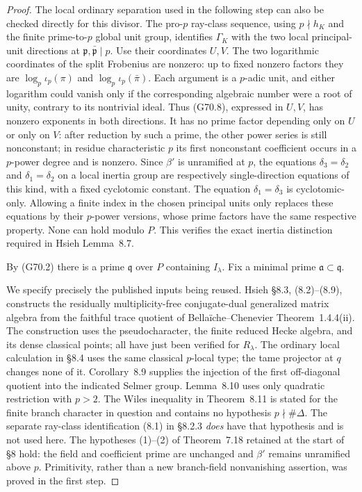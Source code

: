 \begin{proof}
The local ordinary separation used in the following step
can also be checked directly for this divisor.
The pro-$p$ ray-class sequence, using $p\nmid h_K$ and the
finite prime-to-$p$ global unit group, identifies
$\Gamma_K$ with the two local principal-unit directions
at $\mathfrak p,\bar{\mathfrak p}\mid p$.
Use their coordinates $U,V$.
The two logarithmic coordinates of the split Frobenius
are nonzero: up to fixed nonzero factors they are
$\log_p\iota_p(\pi)$ and
$\log_p\iota_p(\bar\pi)$.  Each argument is a $p$-adic
unit, and either logarithm could vanish only if the
corresponding algebraic number were a root of unity,
contrary to its nontrivial ideal.
Thus (G70.8), expressed in $U,V$, has nonzero exponents
in both directions.  It has no prime factor depending
only on $U$ or only on $V$: after reduction by such a
prime, the other power series is still nonconstant;
in residue characteristic $p$ its first nonconstant
coefficient occurs in a $p$-power degree and is nonzero.
Since $\beta'$ is unramified at $p$, the equations
$\delta_3=\delta_2$ and $\delta_1=\delta_2$ on a local
inertia group are respectively single-direction equations
of this kind, with a fixed cyclotomic constant.
The equation $\delta_1=\delta_3$ is cyclotomic-only.
Allowing a finite index in the chosen principal units
only replaces these equations by their $p$-power versions,
whose prime factors have the same respective property.
None can hold modulo $P$.  This verifies the exact
inertia distinction required in Hsieh Lemma~8.7.

By (G70.2) there is a prime $\mathfrak q$ over $P$
containing $I_\lambda$.  Fix a minimal prime
$\mathfrak a\subset\mathfrak q$.

We specify precisely the published inputs being reused.
Hsieh \S8.3, (8.2)--(8.9), constructs the residually
multiplicity-free conjugate-dual generalized matrix
algebra from the faithful trace quotient of
Bella\"iche--Chenevier Theorem~1.4.4(ii).
The construction uses the pseudocharacter, the finite
reduced Hecke algebra, and its dense classical points;
all have just been verified for $R_\lambda$.
The ordinary local calculation in \S8.4 uses the same
classical $p$-local type; the tame projector at $q$ changes
none of it.  Corollary~8.9 supplies the injection of the
first off-diagonal quotient into the indicated Selmer
group.  Lemma~8.10 uses only quadratic restriction with
$p>2$.  The Wiles inequality in Theorem~8.11 is stated
for the finite branch character in question and contains
no hypothesis $p\nmid\#\Delta$.
The separate ray-class identification (8.1) in \S8.2.3
\emph{does} have that hypothesis and is not used here.
The hypotheses (1)--(2) of Theorem~7.18 retained at the
start of \S8 hold: the field and coefficient prime are
unchanged and $\beta'$ remains unramified above $p$.
Primitivity, rather than a new branch-field nonvanishing
assertion, was proved in the first step.


\end{proof}
